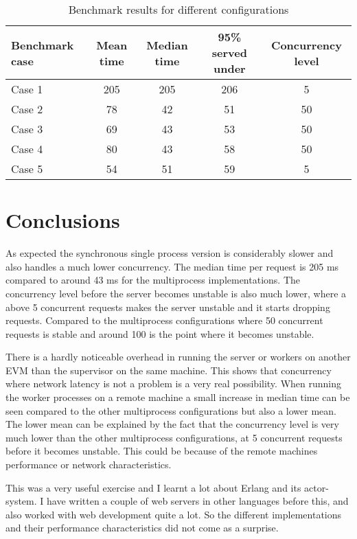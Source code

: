 \documentclass[a4paper, 11pt]{article}
\begin{document}
\begin{table}[h]
\centering
\begin{tabular}{lcccc}
Benchmark case & Mean time & Median time & 95\% served under & Concurrency level\\\hline
Case 1 & 205 & 205 & 206 & 5\\\hline
Case 2 & 78 & 42 & 51 & 50\\\hline
Case 3 & 69 & 43 & 53 & 50\\\hline
Case 4 & 80 & 43 & 58 & 50\\\hline
Case 5 & 54 & 51 & 59 & 5\\\hline
\end{tabular}
\caption{Benchmark results for different configurations}
\label{tab:results}
\end{table}

\section{Conclusions}

As expected the synchronous single process version is considerably slower and also handles a much lower concurrency. The
median time per request is 205 ms compared to around 43 ms for the multiprocess implementations. The concurrency level
before the server becomes unstable is also much lower, where a above 5 concurrent requests makes the server unstable
and it starts dropping requests. Compared to the multiprocess configurations where 50 concurrent requests is stable
and around 100 is the point where it becomes unstable.

There is a hardly noticeable overhead in running the server or workers on another EVM than the supervisor on the same
machine. This shows that concurrency where network latency is not a problem is a very real possibility.
When running the worker processes on a remote machine a small increase in median time can be seen compared to the other
 multiprocess configurations but also a lower mean. The lower mean can be explained by the fact that the concurrency
  level is very much lower than the other multiprocess configurations, at 5 concurrent requests before it becomes unstable.
  This could be because of the remote machines performance or network characteristics.

This was a very useful exercise and I learnt a lot about Erlang and its actor-system. I have written a couple of
web servers in other languages before this, and also worked with web development quite a lot. So the different
implementations and their performance characteristics did not come as a surprise.
\end{document}
